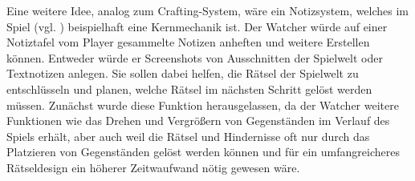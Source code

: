 Eine weitere Idee, analog zum Crafting-System, wäre ein Notizsystem, welches im Spiel  (vgl. \cite{colepowered_games_shadows_nodate}) beispielhaft eine Kernmechanik ist. Der Watcher würde auf einer Notiztafel vom Player gesammelte Notizen anheften und weitere Erstellen können. Entweder würde er Screenshots von Ausschnitten der Spielwelt oder Textnotizen anlegen. Sie sollen dabei helfen, die Rätsel der Spielwelt zu entschlüsseln und planen, welche Rätsel im nächsten Schritt gelöst werden müssen. Zunächst wurde diese Funktion herausgelassen, da der Watcher weitere Funktionen wie das Drehen und Vergrößern von Gegenständen im Verlauf des Spiels erhält, aber auch weil die Rätsel und Hindernisse oft nur durch das Platzieren von Gegenständen gelöst werden können und für ein umfangreicheres Rätseldesign ein höherer Zeitwaufwand nötig gewesen wäre.












